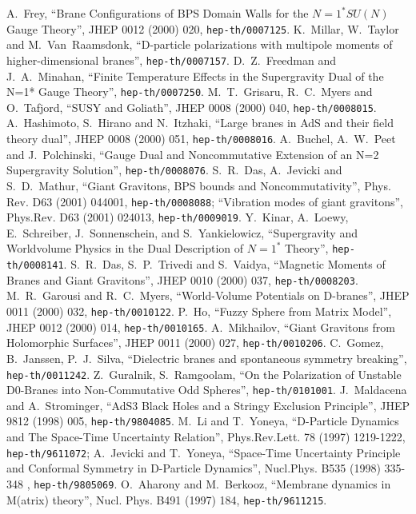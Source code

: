 \documentclass[a4paper,12pt]{article}
\begin{document}
{\begin{thebibliography}{30}
 A.~Frey, ``Brane Configurations of BPS Domain Walls for the $N=1^* SU(N)$ Gauge Theory'', JHEP 0012 (2000) 020, {\tt hep-th/0007125}.
 K.~Millar, W.~Taylor and M.~Van~Raamsdonk, ``D-particle polarizations with multipole moments of higher-dimensional branes'', {\tt hep-th/0007157}.
 D.~Z.~Freedman and J.~A.~Minahan, ``Finite Temperature Effects in the Supergravity Dual of the N=1* Gauge Theory'', {\tt hep-th/0007250}.
 M.~T.~Grisaru, R.~C.~Myers and O.~Tafjord, ``SUSY and Goliath'', JHEP 0008 (2000) 040, {\tt hep-th/0008015}.
 A.~Hashimoto, S.~Hirano and N.~Itzhaki, ``Large branes in AdS and their field theory dual'', JHEP 0008 (2000) 051, {\tt hep-th/0008016}.
 A.~Buchel, A.~W.~Peet and J.~Polchinski, ``Gauge Dual and Noncommutative Extension of an N=2 Supergravity Solution'', {\tt hep-th/0008076}.
 S.~R.~Das, A.~Jevicki and S.~D.~Mathur, ``Giant Gravitons, BPS bounds and Noncommutativity'', Phys. Rev. D63 (2001) 044001, {\tt hep-th/0008088}; ``Vibration modes of giant gravitons'', Phys.Rev. D63 (2001) 024013, {\tt hep-th/0009019}.
 Y.~Kinar, A.~Loewy, E.~Schreiber, J.~Sonnenschein, and S.~Yankielowicz, ``Supergravity and Worldvolume Physics in the Dual Description of $N=1^*$ Theory'', {\tt hep-th/0008141}.
  S.~R.~Das, S.~P.~Trivedi and S.~Vaidya, ``Magnetic Moments of Branes and Giant Gravitons'', JHEP 0010 (2000) 037, {\tt hep-th/0008203}.
 M.~R.~Garousi and R.~C.~Myers, ``World-Volume Potentials on D-branes'', JHEP 0011 (2000) 032, {\tt hep-th/0010122}.
 P.~Ho, ``Fuzzy Sphere from Matrix Model'', JHEP 0012 (2000) 014, {\tt hep-th/0010165}.
 A.~Mikhailov, ``Giant Gravitons from Holomorphic Surfaces'', JHEP 0011 (2000) 027, {\tt hep-th/0010206}.
  C.~Gomez, B.~Janssen, P.~J.~Silva, ``Dielectric branes and spontaneous symmetry breaking'', {\tt hep-th/0011242}.
  Z.~Guralnik, S.~Ramgoolam, ``On the Polarization of Unstable D0-Branes into Non-Commutative Odd Spheres'', {\tt hep-th/0101001}.
  J.~Maldacena and A.~Strominger, ``AdS3 Black Holes and a Stringy Exclusion Principle'', JHEP 9812 (1998) 005, {\tt hep-th/9804085}.
 M.~Li and T.~Yoneya, ``D-Particle Dynamics and The Space-Time Uncertainty Relation'', Phys.Rev.Lett. 78 (1997) 1219-1222, {\tt hep-th/9611072}; A.~Jevicki and T.~Yoneya, ``Space-Time Uncertainty Principle and Conformal Symmetry in D-Particle Dynamics'', Nucl.Phys. B535 (1998) 335-348
, {\tt hep-th/9805069}.
O.~Aharony and M.~Berkooz, ``Membrane dynamics in M(atrix) theory'', Nucl. Phys. B491 (1997) 184, {\tt hep-th/9611215}.

\end{thebibliography}}
\end{document}
